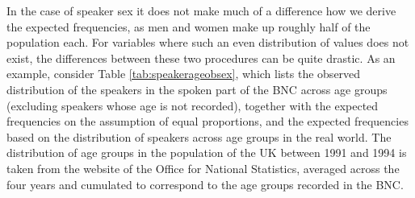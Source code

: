 In the case of speaker sex it does not make much of a difference how we derive the expected frequencies, as men and women make up roughly half of the population each. For variables where such an even distribution of values does not exist, the differences between these two procedures can be quite drastic. As an example, consider Table \ref{tab:speakerageobsex}, which lists the observed distribution of the speakers in the spoken part of the BNC across age groups (excluding speakers whose age is not recorded), together with the expected frequencies on the assumption of equal proportions, and the expected frequencies based on the distribution of speakers across age groups in the real world. The distribution of age groups in the population of the UK between 1991 and 1994 is taken from the website of the Office for National Statistics, averaged across the four years and cumulated to correspond to the age groups recorded in the BNC.

\begin{table}[!htbp]
\caption{Observed and expected frequencies of Speaker Age in the BNC}
\label{tab:speakerageobsex}
\end{table}

